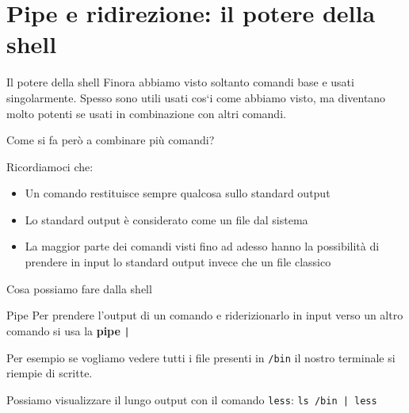 \documentclass{beamer}
\begin{document}
\section{Pipe e ridirezione: il potere della shell}
\begin{frame}{Il potere della shell}
  Finora abbiamo visto soltanto comandi base e usati singolarmente. Spesso sono
  utili usati cos`i come abbiamo visto, ma diventano molto potenti se usati in
  combinazione con altri comandi.\bigskip

  Come si fa però a combinare più comandi? \bigskip 

  Ricordiamoci che:
  \begin{itemize}
    \item Un comando restituisce sempre qualcosa sullo standard output
    \item Lo standard output è considerato come un file dal sistema
    \item La maggior parte dei comandi visti fino ad adesso hanno la 
      possibilità di prendere in input lo standard output invece che un file 
      classico
  \end{itemize}
\end{frame}

\begin{frame}{Cosa possiamo fare dalla shell}
  \begin{figure}
  \end{figure}
\end{frame}

\begin{frame}{Pipe}
  Per prendere l'output di un comando e riderizionarlo in input verso un altro
  comando si usa la \textbf{pipe} \texttt{|}\bigskip

  Per esempio se vogliamo vedere tutti i file presenti in \texttt{/bin} il 
  nostro terminale si riempie di scritte.\bigskip

  Possiamo visualizzare il lungo output con il comando \texttt{less}: 
  \texttt{ls /bin | less}
\end{frame}
\end{document}
